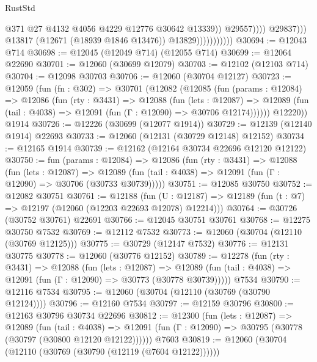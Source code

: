 \begin{lexlean}{RustStd}
\begin{coremodule}
                                            @371
                                            @27
                                            @4132
                                            @4056
                                            @4229
                                            @12776
                                            @30642
                                            @13339))
                                        @29557))))
                                @29837)))
                          @13817
                          (@12671 (@18939 @1846 @13476))
                          @13829)))))))))))
@30694 := @12043 @714
@30698 := @12045 (@12049 @714) (@12055 @714)
@30699 := @12064 @22690
@30701 := @12060 (@30699 @12079)
@30703 := @12102 (@12103 @714)
@30704 := @12098 @30703
@30706 := @12060 (@30704 @12127)
@30723 := @12059
    (fun (fn : @302) =>
    @30701
      (@12082
        (@12085
          (fun (params : @12084) =>
          @12086
            (fun (rty : @3431) =>
            @12088
              (fun (lets : @12087) =>
              @12089 (fun (tail : @4038) => @12091 (fun (Γ : @12090) => @30706 @12174))))))
        @12220))
    @1914
@30726 := @12226 (@30699 (@12077 @1914))
@30729 := @12139 (@12140 @1914) @22693
@30733 := @12060 (@12131 (@30729 @12148) @12152)
@30734 := @12165 @1914
@30739 := @12162 (@12164 @30734 @22696 @12120 @12122)
@30750 := fun (params : @12084) =>
  @12086
    (fun (rty : @3431) =>
    @12088
      (fun (lets : @12087) =>
      @12089 (fun (tail : @4038) => @12091 (fun (Γ : @12090) => @30706 (@30733 @30739)))))
@30751 := @12085 @30750
@30752 := @12082 @30751
@30761 := @12188
    (fun (U : @12187) => @12189 (fun (t : @7) => @12197 (@12060 (@12203 @22693 @12078) @12214)))
@30764 := @30726 (@30752 @30761) @22691
@30766 := @12045 @30751 @30761
@30768 := @12275 @30750 @7532
@30769 := @12112 @7532
@30773 := @12060 (@30704 (@12110 (@30769 @12125)))
@30775 := @30729 (@12147 @7532)
@30776 := @12131 @30775
@30778 := @12060 (@30776 @12152)
@30789 := @12278
    (fun (rty : @3431) =>
    @12088
      (fun (lets : @12087) =>
      @12089 (fun (tail : @4038) => @12091 (fun (Γ : @12090) => @30773 (@30778 @30739)))))
    @7534
@30790 := @12116 @7534
@30795 := @12060 (@30704 (@12110 (@30769 (@30790 @12124))))
@30796 := @12160 @7534
@30797 := @12159 @30796
@30800 := @12163 @30796 @30734 @22696
@30812 := @12300
    (fun (lets : @12087) =>
    @12089
      (fun (tail : @4038) =>
      @12091 (fun (Γ : @12090) => @30795 (@30778 (@30797 (@30800 @12120 @12122))))))
    @7603
@30819 := @12060 (@30704 (@12110 (@30769 (@30790 (@12119 (@7604 @12122))))))

\end{coremodule}
\end{lexlean}
